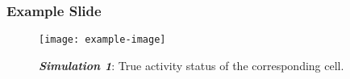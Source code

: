 \documentclass{beamer}
\begin{document}
\begin{frame}

\frametitle{Example Slide}

\begin{figure}
   \texttt{[image: example-image]}
   \caption{\textbf{\emph{Simulation 1}}: True activity status of the corresponding cell.}
\end{figure}

\end{frame}
\end{document}
